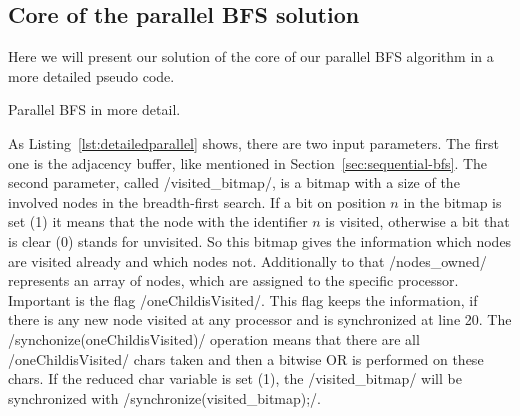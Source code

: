 \documentclass[12pt,a4paper]{article}
\begin{document}
\subsection{Core of the parallel BFS solution}
\label{sec:core}
Here we will present our solution of the core of our parallel BFS algorithm in a more detailed pseudo code.\\
\begin{listing}[h]
\begin{ccode}
/*
input: every proc has adjacency buffer of owned nodes, visited_bitmap where root is set to one
output: parent array
*/
void* BFS(adj_buffer, visited_bitmap){
	char oneChildisVisited = 1;
	while (oneChildisVisited){
	oneChildisVisited = 0;
	for (i = 0; i < size(nodes_owned); i++){
		if (nodes_owned[i] is visited for the first time) {
			neighbours = get_neighbours(adj_buffer, nodes_owned[i]);
			for (j = 0; j < size(neighbours); j++){
				if (neighbours[j] is not visited) {
					oneChildisVisited = 1;
					set_visited_bitmap(visited_bitmap, neighbours[j]); // sets the visited bitmap on position of neighbour[j] to 1
					save_parent(parent_array, nodes_owned[i]+1,neighbours[j]); // saves that nodes_owned[i]+1 is parent of neighbours[j] in parent array
				}
			}
		}	
	}
	synchronize(oneChildisVisited);
	if (oneChildisVisited){
		sychronize(visited_bitmap);
	}
	return parent_array;
}
\end{ccode}
\caption{Parallel BFS in more detail.}
\label{lst:detailedparallel}
\end{listing}
As Listing~\ref{lst:detailedparallel} shows, there are two input parameters. The first one is the adjacency buffer, like mentioned in Section~\ref{sec:sequential-bfs}. The second parameter, called \cinline/visited_bitmap/, is a bitmap with a size of the involved nodes in the breadth-first search. If a bit on position \(n\) in the bitmap is set (1) it means that the node with the identifier \(n\) is visited, otherwise a bit that is clear (0) stands for unvisited. So this bitmap gives the information which nodes are visited already and which nodes not. Additionally to that \cinline/nodes_owned/ represents an array of nodes, which are assigned to the specific processor.\\
Important is the flag \cinline/oneChildisVisited/. This flag keeps the information, if there is any new node visited at any processor and is synchronized at line 20. The \cinline/synchonize(oneChildisVisited)/ operation means that there are all \cinline/oneChildisVisited/ chars taken and then a bitwise OR is performed on these chars. If the reduced char variable is set (1), the \cinline/visited_bitmap/ will be synchronized with \cinline/synchronize(visited_bitmap);/.\\
\end{document}
